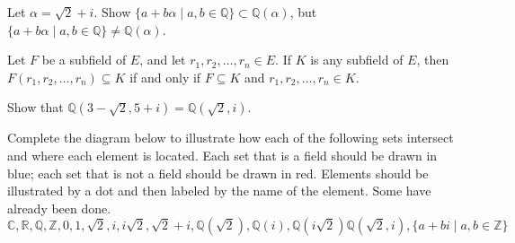 \begin{problem}\label{prob.QAdjoinRoot2PlusI}
Let $\alpha = \sqrt{2} + i$. Show  $\{a+b\alpha\mid a,b\in \mathbb{Q}\} \subset \mathbb{Q}(\alpha)$, but $\{a+b\alpha\mid a,b\in \mathbb{Q}\} \neq \mathbb{Q}(\alpha)$. 
\end{problem}


\begin{theorem}\label{thm.FieldAdjoinElementsContainedInField}
Let $F$ be a subfield of $E$, and let $r_1,r_2,\ldots,r_n \in E$. If $K$ is any subfield of $E$, then $F(r_1,r_2,\ldots,r_n) \subseteq K$ if and only if $F\subseteq K$ and $r_1,r_2,\ldots,r_n\in K$.
\end{theorem}

\begin{problem}\label{prob.QAdjoinRoot27Root7}
Show that $\mathbb{Q}\left(3-\sqrt{2},5+i\right) = \mathbb{Q}\left(\sqrt{2},i\right)$.
\end{problem}

\begin{problem}\label{prob.DiagramSubfieldsRoot2andi}
Complete the diagram below to illustrate how each of the following sets intersect and where each element is located. Each set that is a field should be drawn in blue; each set that is not a field should be drawn in red. Elements should be illustrated by a dot and then labeled by the name of the element. Some have already been done.
\[\mathbb{C},\mathbb{R},\mathbb{Q}, \mathbb{Z}, 0, 1, \sqrt{2}, i, i\sqrt{2}, \sqrt{2}+i, \mathbb{Q}\left(\sqrt{2}\right), \mathbb{Q}(i), \mathbb{Q}\left(i\sqrt{2}\right) \mathbb{Q}\left(\sqrt{2},i\right), \{a+bi\mid a,b\in \mathbb{Z}\}\]
\begin{center}
\end{center}
\end{problem}

